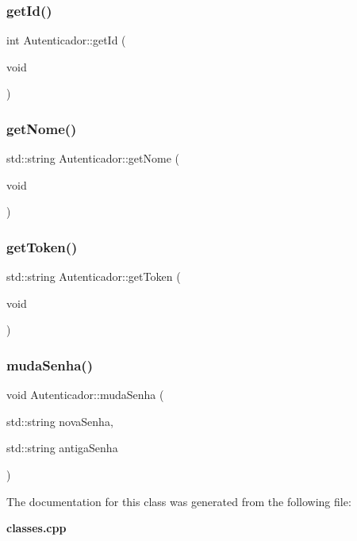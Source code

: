 \mbox{\label{class_autenticador_a5e525cb7934385d6cda445245a589d1e}} 
\subsubsection{get\+Id()}
{\footnotesize\ttfamily int Autenticador\+::get\+Id (\begin{DoxyParamCaption}\item[{void}]{ }\end{DoxyParamCaption})\hspace{0.3cm}{\ttfamily [inline]}}

\mbox{\label{class_autenticador_a6ac64162bdff37c3a84c2212f768f1a4}} 
\subsubsection{get\+Nome()}
{\footnotesize\ttfamily std\+::string Autenticador\+::get\+Nome (\begin{DoxyParamCaption}\item[{void}]{ }\end{DoxyParamCaption})\hspace{0.3cm}{\ttfamily [inline]}}

\mbox{\label{class_autenticador_a86e039f92325107cb467cf519dea102c}} 
\subsubsection{get\+Token()}
{\footnotesize\ttfamily std\+::string Autenticador\+::get\+Token (\begin{DoxyParamCaption}\item[{void}]{ }\end{DoxyParamCaption})\hspace{0.3cm}{\ttfamily [inline]}}

\mbox{\label{class_autenticador_ad9f736a8521bd95f746c9f8f99278458}} 
\subsubsection{muda\+Senha()}
{\footnotesize\ttfamily void Autenticador\+::muda\+Senha (\begin{DoxyParamCaption}\item[{std\+::string}]{nova\+Senha,  }\item[{std\+::string}]{antiga\+Senha }\end{DoxyParamCaption})\hspace{0.3cm}{\ttfamily [inline]}}



The documentation for this class was generated from the following file\+:\begin{DoxyCompactItemize}
\item 
\textbf{ classes.\+cpp}\end{DoxyCompactItemize}
